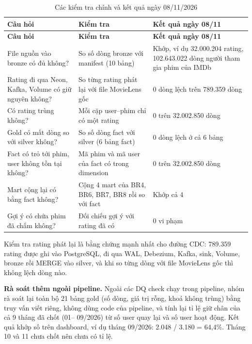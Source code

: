 \documentclass[a4paper,11pt]{article}
\newlength{\reporttablewidth}
\begin{document}
\begingroup
\small
{}
\setlength{\tabcolsep}{4pt}
\renewcommand{\arraystretch}{1.18}
\setlength{\reporttablewidth}{\dimexpr\linewidth-4\tabcolsep\relax}
\begin{longtable}{@{}L{0.25\reporttablewidth} L{0.39\reporttablewidth} L{0.36\reporttablewidth}@{}}
\caption[Các kiểm tra chính và kết quả (mục 5.1)]{Các kiểm tra chính và kết quả ngày 08/11/2026}\label{tab:17} \\
\toprule
\textbf{Câu hỏi} & \textbf{Kiểm tra} & \textbf{Kết quả ngày 08/11} \\
\midrule
\endfirsthead
\toprule
\textbf{Câu hỏi} & \textbf{Kiểm tra} & \textbf{Kết quả ngày 08/11} \\
\midrule
\endhead
\midrule
\endfoot
\bottomrule
\endlastfoot
File nguồn vào bronze có đủ không? & So số dòng bronze với manifest (10 bảng) & Khớp, ví dụ 32.000.204 rating, 102.643.022 dòng người tham gia phim của IMDb \\
Rating đi qua Neon, Kafka, Volume có giữ nguyên không? & So từng rating phát lại với file MovieLens gốc & 0 dòng lệch trên 789.359 dòng \\
Có rating trùng không? & Mỗi cặp user--phim chỉ có một rating & 0 trên 32.002.850 dòng \\
Gold có mất dòng so với silver không? & So số dòng fact với silver (6 bảng fact) & 0 dòng lệch ở cả 6 bảng \\
Fact có trỏ tới phim, user không tồn tại không? & Mã phim và mã user của fact có trong dimension & 0 trên 32.002.850 dòng \\
Mart cộng lại có bằng fact không? & Cộng 4 mart của BR4, BR6, BR7, BR8 rồi so với fact & Khớp cả 4 \\
Gợi ý có chứa phim đã chấm không? & Đối chiếu gợi ý với rating đã có & 0 vi phạm \\
\end{longtable}
\endgroup

Kiểm tra rating phát lại là bằng chứng mạnh nhất cho đường CDC: 789.359 rating được ghi vào PostgreSQL, đi qua WAL, Debezium, Kafka, sink, Volume, bronze rồi MERGE vào silver, và khi so từng dòng với file MovieLens gốc thì không lệch dòng nào.

\textbf{Rà soát thêm ngoài pipeline.} Ngoài các DQ check chạy trong pipeline, nhóm rà soát lại toàn bộ 21 bảng gold (số dòng, giá trị rỗng, khoá không trùng) bằng truy vấn viết riêng, không dùng code của pipeline, và tính lại tỉ lệ giữ chân của cả 9 tháng đã chốt (01-- 09/2026) từ số user quay lại và số user hoạt động. Kết quả khớp số trên dashboard, ví dụ tháng 09/2026: 2.048 / 3.180 = 64,4\%. Tháng 10 và 11 chưa chốt nên chưa có tỉ lệ.
\end{document}
